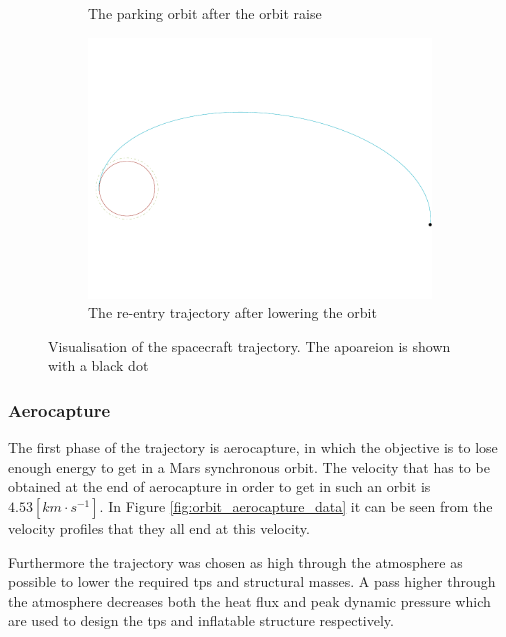\begin{figure}
\begin{subfigure}[b]{0.7\textwidth}
		\vspace{-15mm}
		\caption{The parking orbit after the orbit raise}
		\label{fig:parking_trajectory}
	\end{subfigure}
	\begin{subfigure}[b]{0.7\textwidth}
		\vspace{-22mm}
		\includegraphics[width=\textwidth]{./Figure/Orbit/re-entry_trajectory.pdf}
		\vspace{-25mm}
		\caption{The re-entry trajectory after lowering the orbit}
		\label{fig:re_entry_trajectory}
	\end{subfigure}
	\caption[Visualisation of the spacecraft trajectory]{Visualisation of the spacecraft trajectory. The apoareion is shown with a black dot}
	\label{fig:trajectory}
\end{figure}

\subsubsection{Aerocapture} \label{sec:aerocapture}
The first phase of the trajectory is aerocapture, in which the objective is to lose enough energy to get in a Mars synchronous orbit. The velocity that has to be obtained at the end of aerocapture in order to get in such an orbit is $4.53 \left[km \cdot s^{-1}\right]$. In Figure \ref{fig:orbit_aerocapture_data} it can be seen from the velocity profiles that they all end at this velocity.

Furthermore the trajectory was chosen as high through the atmosphere as possible to lower the required \gls{tps} and structural masses. A pass higher through the atmosphere decreases both the heat flux and peak dynamic pressure which are used to design the \gls{tps} and inflatable structure respectively.

